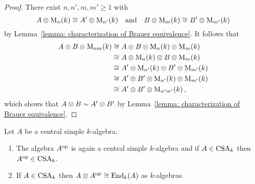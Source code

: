 \begin{proof}
  There exist $n, n', m, m' \geq 1$ with
  \[
          A \mathbin{\otimes} \operatorname{M}_n(k)
    \cong A' \mathbin{\otimes} \operatorname{M}_{n'}(k)
    \quad\text{and}\quad
          B \mathbin{\otimes} \operatorname{M}_m(k)
    \cong B'  \mathbin{\otimes} \operatorname{M}_{m'}(k)
  \]
  by Lemma~\ref{lemma: characterization of Brauer equivalence}.
  It follows that
  \begin{align*}
            A \mathbin{\otimes} B \mathbin{\otimes} \operatorname{M}_{nm}(k)
    &\cong  A \mathbin{\otimes} B \mathbin{\otimes} \operatorname{M}_{n}(k) \mathbin{\otimes} \operatorname{M}_{m}(k) \\
    &\cong  A \mathbin{\otimes} \operatorname{M}_{n}(k) \mathbin{\otimes} B \mathbin{\otimes} \operatorname{M}_{m}(k) \\
    &\cong  A' \mathbin{\otimes} \operatorname{M}_{n'}(k) \mathbin{\otimes} B' \mathbin{\otimes} \operatorname{M}_{m'}(k) \\
    &\cong  A' \mathbin{\otimes} B' \mathbin{\otimes} \operatorname{M}_{n'}(k) \mathbin{\otimes} \operatorname{M}_{m'}(k) \\
    &\cong  A' \mathbin{\otimes} B' \mathbin{\otimes} \operatorname{M}_{n'm'}(k) \,,
  \end{align*}
  which shows that $A \mathbin{\otimes} B \sim A' \mathbin{\otimes} B'$ by Lemma~\ref{lemma: characterization of Brauer equivalence}.
\end{proof}


\begin{lemma}
  Let $A$ be a central simple $k$-algebra.
  \begin{enumerate}
    \item
      The algebra $A^{\operatorname{op}}$ is again a central simple $k$-algebra and if $A \in \operatorname{CSA}_k$ then $A^{\operatorname{op}} \in \operatorname{CSA}_k$.
    \item
      If $A \in \operatorname{CSA}_k$ then $A \mathbin{\otimes} A^{\operatorname{op}} \cong \operatorname{End}_k(A)$ as $k$-algebras.
  \end{enumerate}
\end{lemma}


